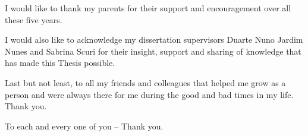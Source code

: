 
I would like to thank my parents for their support and encouragement over all these five years. 

I would also like to acknowledge my dissertation supervisors Duarte Nuno Jardim Nunes and Sabrina Scuri for their insight, support and sharing of knowledge that has made this Thesis possible.

Last but not least, to all my friends and colleagues that helped me grow as a person and were always there for me during the good and bad times in my life. Thank you.

To each and every one of you -- Thank you.